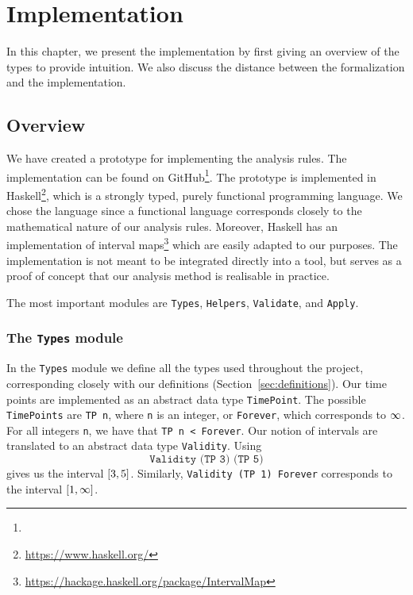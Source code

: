 \chapter{Implementation}  
\label{cha:implementation}

In this chapter, we present the implementation by first giving an overview of the types to provide intuition. We also discuss the distance between the formalization and the implementation.


\section{Overview}
\label{sec:overview}
We have created a prototype for implementing the analysis rules. The implementation can be found on GitHub\footnote{}. The prototype is implemented in Haskell\footnote{\url{https://www.haskell.org/}}, which is a strongly typed, purely functional programming language. We chose the language since a functional language corresponds closely to the mathematical nature of our analysis rules. Moreover, Haskell has an implementation of interval maps\footnote{\url{https://hackage.haskell.org/package/IntervalMap}} which are easily adapted to our purposes. The implementation is not meant to be integrated directly into a tool, but serves as a proof of concept that our analysis method is realisable in practice.

The most important modules are \texttt{Types}, \texttt{Helpers}, \texttt{Validate}, and \texttt{Apply}. 

\subsection{The \texttt{Types} module}
\label{sub:the-types-module}

In the \texttt{Types} module we define all the types used throughout the project, corresponding closely with our definitions (Section~\vref{sec:definitions}). Our time points are implemented as an abstract data type \texttt{TimePoint}. The possible \texttt{TimePoints} are \texttt{TP n}, where \texttt{n} is an integer, or \texttt{Forever}, which corresponds to $\infty$. For all integers \texttt{n}, we have that \texttt{TP n < Forever}. Our notion of intervals are translated to an abstract data type \texttt{Validity}. Using
\[
   \texttt{Validity (TP 3) (TP 5)}
\]
gives us the interval $\interval{3}{5}$. Similarly, \texttt{Validity (TP 1) Forever} corresponds to the interval $\interval{1}{\forever}$. 

